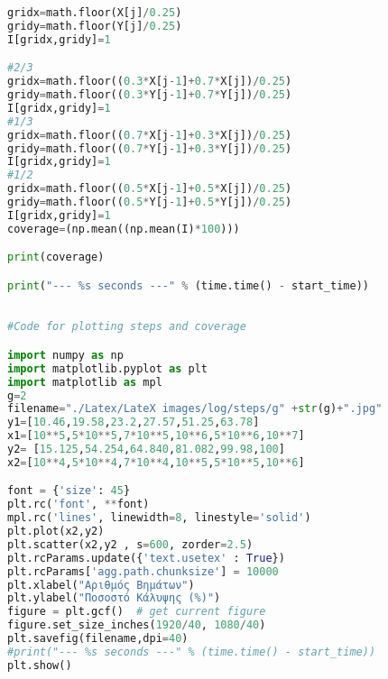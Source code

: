 \begin{lstlisting}[language=Python]
gridx=math.floor(X[j]/0.25)
gridy=math.floor(Y[j]/0.25)
I[gridx,gridy]=1

#2/3
gridx=math.floor((0.3*X[j-1]+0.7*X[j])/0.25)
gridy=math.floor((0.3*Y[j-1]+0.7*Y[j])/0.25)
I[gridx,gridy]=1
#1/3
gridx=math.floor((0.7*X[j-1]+0.3*X[j])/0.25)
gridy=math.floor((0.7*Y[j-1]+0.3*Y[j])/0.25)
I[gridx,gridy]=1
#1/2
gridx=math.floor((0.5*X[j-1]+0.5*X[j])/0.25)
gridy=math.floor((0.5*Y[j-1]+0.5*Y[j])/0.25)
I[gridx,gridy]=1
coverage=(np.mean((np.mean(I)*100)))

print(coverage)

print("--- %s seconds ---" % (time.time() - start_time))

\end{lstlisting}

\begin{lstlisting}[language=Python]

#Code for plotting steps and coverage

import numpy as np
import matplotlib.pyplot as plt
import matplotlib as mpl
g=2
filename="./Latex/LateX images/log/steps/g" +str(g)+".jpg"
y1=[10.46,19.58,23.2,27.57,51.25,63.78]
x1=[10**5,5*10**5,7*10**5,10**6,5*10**6,10**7]
y2= [15.125,54.254,64.840,81.082,99.98,100]
x2=[10**4,5*10**4,7*10**4,10**5,5*10**5,10**6]

font = {'size': 45}
plt.rc('font', **font)
mpl.rc('lines', linewidth=8, linestyle='solid')
plt.plot(x2,y2) 
plt.scatter(x2,y2 , s=600, zorder=2.5)
plt.rcParams.update({'text.usetex' : True})
plt.rcParams['agg.path.chunksize'] = 10000 
plt.xlabel("Αριθμός Βημάτων")
plt.ylabel("Ποσοστό Κάλυψης (%)")
figure = plt.gcf()  # get current figure
figure.set_size_inches(1920/40, 1080/40)
plt.savefig(filename,dpi=40)
#print("--- %s seconds ---" % (time.time() - start_time))
plt.show()
\end{lstlisting}

